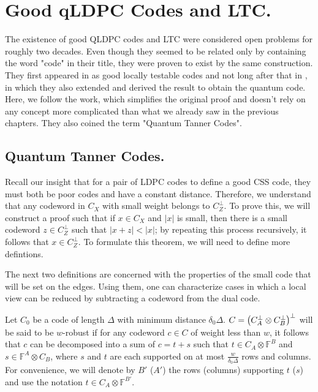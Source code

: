\chapter{Good qLDPC Codes and LTC.}

The existence of good QLDPC codes and LTC were considered open problems for roughly two decades. Even though they seemed to be related only by containing the word "code" in their title, they were proven to exist by the same construction. They first appeared in \cite{Dinur} as good locally testable codes and not long after that in \cite{Pavel}, in which they also extended and derived the result to obtain the quantum code. Here, we follow the \cite{leverrier2022quantum} work, which simplifies the original proof and doesn't rely on any concept more complicated than what we already saw in the previous chapters. They also coined the term "Quantum Tanner Codes".


\section{Quantum Tanner Codes.}
Recall our insight that for a pair of LDPC codes to define a good CSS code, they must both be poor codes and have a constant distance. Therefore, we understand that any codeword in $C_{X}$ with small weight belongs to $C_{Z}^\perp$. To prove this, we will construct a proof such that if $x \in C_{X}$ and $|x|$ is small, then there is a small codeword $z \in C_{Z}^{\perp}$ such that $|x+z| < |x|$; by repeating this process recursively, it follows that $x\in C_{Z}^{\perp}$. To formulate this theorem, we will need to define more defintions.
  
 The next two definitions are concerned with the properties of the small code that will be set on the edges. Using them, one can characterize cases in which a local view can be reduced by subtracting a codeword from the dual code. 

\begin{definition}[$w$-Robustness] 
  \label{def:wrobust}
Let $C_0$ be a code of length $\Delta$ with minimum distance $\delta_0\Delta$. $C = \left( C_{A}^{\perp}\otimes C_{B}^{\perp} \right)^{\perp} $ will be said to be $w$-robust if for any codeword $c \in C$ of weight less than $w$, it follows that $c$ can be decomposed into a sum of $c = t + s$ such that $t \in C_A \otimes \mathbb{F}^{B}$ and $s \in \mathbb{F}^A \otimes C_B$, where $s$ and $t$ are each supported on at most $\frac{w}{\delta_0\Delta}$ rows and columns. For convenience, we will denote by $B'$ ($A'$) the rows (columns) supporting $t$ ($s$) and use the notation $t \in C_A \otimes \mathbb{F}^{B'}$.
\end{definition}

